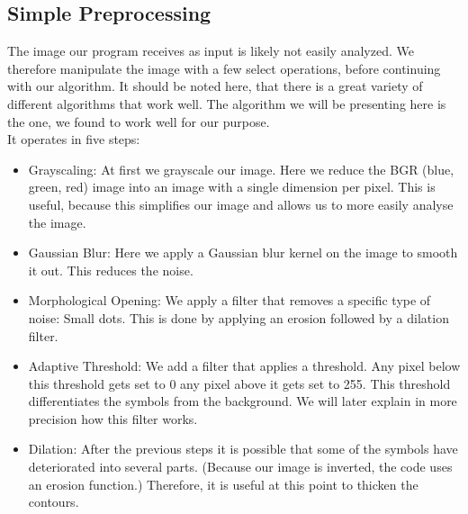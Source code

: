 \documentclass[12pt]{article}
\begin{document}
	\subsection{Simple Preprocessing}%
		The image our program receives as input is likely not easily analyzed.
		We therefore manipulate the image with a few select operations, before continuing with our algorithm.
		It should be noted here, that there is a great variety of different algorithms that work well.
		The algorithm we will be presenting here is the one, we found to work well for our purpose.\\
		It operates in five steps:
		\begin{itemize}
			\item Grayscaling: At first we grayscale our image. Here we reduce the BGR (blue, green, red) image into an image with a single dimension per pixel. This is useful, because this simplifies our image and allows us to more easily analyse the image.
			\item Gaussian Blur: Here we apply a Gaussian blur kernel on the image to smooth it out. This reduces the noise.
			\item Morphological Opening: We apply a filter that removes a specific type of noise: Small dots. This is done by applying an erosion followed by a dilation filter. %
			\item Adaptive Threshold: We add a filter that applies a threshold. Any pixel below this threshold gets set to 0 any pixel above it gets set to 255. %
			This threshold differentiates the symbols from the background.
			We will later explain in more precision how this filter works. %
			\item Dilation: After the previous steps it is possible that some of the symbols have deteriorated into several parts. %
			(Because our image is inverted, the code uses an erosion function.) %
			Therefore, it is useful at this point to thicken the contours.
		\end{itemize}
			
\end{document}
